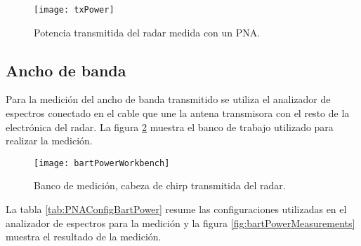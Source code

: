 \begin{figure}[H]
 \centering
 \texttt{[image: txPower]}
 \caption{Potencia transmitida del radar medida con un PNA.}
 \label{fig:txPowerMeasurements}
\end{figure}


\subsection{Ancho de banda}

Para la medición del ancho de banda transmitido se utiliza el analizador de espectros conectado en el cable que une la antena transmisora con el resto de la electrónica del radar. La figura \ref{fig:bartPowerConnections} muestra el banco de trabajo utilizado para realizar la medición.

\begin{figure}[H]
 \centering
 \texttt{[image: bartPowerWorkbench]}
 \caption{Banco de medición, cabeza de chirp transmitida del radar.}
 \label{fig:bartPowerConnections}
\end{figure}

La tabla \ref{tab:PNAConfigBartPower} resume las configuraciones utilizadas en el analizador de espectros para la medición y la figura \ref{fig:bartPowerMeasurements} muestra el resultado de la medición.

